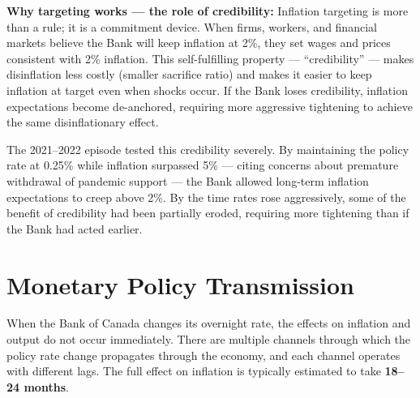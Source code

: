 \textbf{Why targeting works --- the role of credibility:}
Inflation targeting is more than a rule; it is a commitment device.
When firms, workers, and financial markets believe the Bank will keep
inflation at 2\%, they set wages and prices consistent with 2\% inflation.
This self-fulfilling property --- ``credibility'' --- makes disinflation
less costly (smaller sacrifice ratio) and makes it easier to keep
inflation at target even when shocks occur. If the Bank loses credibility,
inflation expectations become de-anchored, requiring more aggressive
tightening to achieve the same disinflationary effect.

The 2021--2022 episode tested this credibility severely. By maintaining
the policy rate at 0.25\% while inflation surpassed 5\% --- citing
concerns about premature withdrawal of pandemic support --- the Bank
allowed long-term inflation expectations to creep above 2\%. By the time
rates rose aggressively, some of the benefit of credibility had been
partially eroded, requiring more tightening than if the Bank had acted
earlier.

\section{Monetary Policy Transmission}
\label{sec:transmission}

When the Bank of Canada changes its overnight rate, the effects on inflation
and output do not occur immediately. There are multiple channels through
which the policy rate change propagates through the economy, and each
channel operates with different lags. The full effect on inflation is
typically estimated to take \textbf{18--24 months}.

